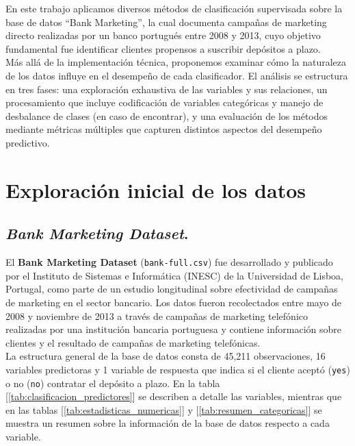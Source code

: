 \documentclass[10pt]{article}
\begin{document}
En este trabajo aplicamos diversos métodos de clasificación supervisada sobre la base de datos ``Bank Marketing'', la cual documenta campañas de marketing directo realizadas por un banco portugués entre 2008 y 2013, cuyo objetivo fundamental fue identificar clientes propensos a suscribir depósitos a plazo.\\

Más allá de la implementación técnica, proponemos examinar cómo la naturaleza de los datos influye en el desempeño de cada clasificador. El análisis se estructura en tres fases: una exploración exhaustiva de las variables y sus relaciones, un procesamiento que incluye codificación de variables categóricas y manejo de desbalance de clases (en caso de encontrar), y una evaluación de los métodos mediante métricas múltiples que capturen distintos aspectos del desempeño predictivo.


\section{Exploración inicial de los datos}\label{sec:dataset}

\subsection{\textit{Bank Marketing Dataset}.}

El \textbf{Bank Marketing Dataset} (\texttt{bank-full.csv}) fue desarrollado y publicado por el Instituto de Sistemas e Informática (INESC) de la Universidad de Lisboa, Portugal, como parte de un estudio longitudinal sobre efectividad de campañas de marketing en el sector bancario. Los datos fueron recolectados entre mayo de 2008 y noviembre de 2013 a través de campañas de marketing telefónico realizadas por una institución bancaria portuguesa y contiene información sobre clientes y el resultado de campañas de marketing telefónicas.\\

La estructura general de la base de datos consta de 45,211 observaciones, 16 variables predictoras y 1 variable de respuesta que indica si el cliente aceptó (\texttt{yes}) o no (\texttt{no}) contratar el depósito a plazo. En la tabla [\ref{tab:clasificacion_predictores}] se describen a detalle las variables, mientras que en las tablas [\ref{tab:estadisticas_numericas}] y [\ref{tab:resumen_categoricas}] se muestra un resumen sobre la información de la base de datos respecto a cada variable.\\
\end{document}
